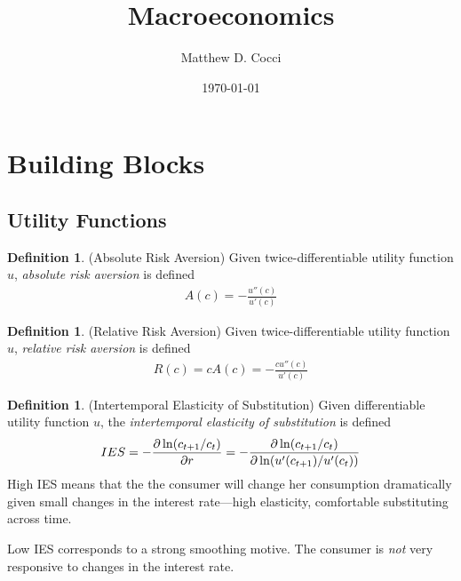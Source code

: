\documentclass[12pt]{article}
\author{Matthew D. Cocci}
\title{Macroeconomics}
\date{\today}
\theoremstyle{plain}
\theoremstyle{definition}
\newtheorem{defn}[thm]{Definition}
\theoremstyle{remark}
\begin{document}
\maketitle

\tableofcontents

\clearpage

\section{Building Blocks}

\subsection{Utility Functions}

\begin{defn}(Absolute Risk Aversion)
Given twice-differentiable utility function $u$,
\emph{absolute risk aversion} is defined
\begin{align*}
  A(c) = -\frac{u''(c)}{u'(c)}
\end{align*}
\end{defn}

\begin{defn}(Relative Risk Aversion)
Given twice-differentiable utility function $u$,
\emph{relative risk aversion} is defined
\begin{align*}
  R(c) = cA(c) = -\frac{c u''(c)}{u'(c)}
\end{align*}
\end{defn}

\begin{defn}(Intertemporal Elasticity of Substitution)
Given differentiable utility function $u$,
the \emph{intertemporal elasticity of substitution} is defined
\begin{align*}
  IES
  = -\frac{\partial \ln(c_{t+1}/c_t)}{\partial r}
  = -\frac{\partial \ln(c_{t+1}/c_t)}{%
    \partial \ln(u'(c_{t+1})/u'(c_t))}
\end{align*}
High IES means that the the consumer will change her consumption
dramatically given small changes in the interest rate---high elasticity,
comfortable substituting across time.

Low IES corresponds to a strong smoothing motive. The consumer is
\emph{not} very responsive to changes in the interest rate.
\end{defn}
\end{document}
